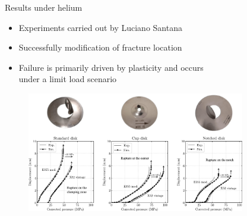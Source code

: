 \documentclass[9pt]{beamer}
\begin{document}
\begin{frame}{Results under helium}

\begin{itemize}
	\item Experiments carried out by Luciano Santana
	\vspace{0.15cm}
	\item Successfully modification of fracture location
	\vspace{0.15cm}
	\item Failure is primarily driven by plasticity and occurs \\ under a limit load scenario
\end{itemize}

\vspace{0.15cm}

\begin{figure}
	\centering
	\includegraphics[width=0.85\textwidth]{Images/disks_helium.pdf} \\
\end{figure}


\end{frame}

\end{document}
